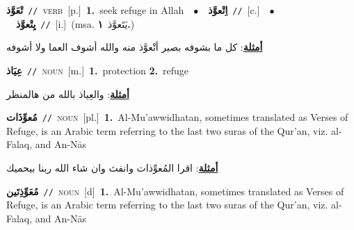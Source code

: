 \documentclass[10pt,a4paper,twoside]{article} %
\begin{document}
\begin{multicols}{2}
{\setlength\topsep{0pt}\textbf{\foreignlanguage{arabic}{تْعَوَّذ}}\ {\color{gray}\texttt{//}\color{black}}\ \textsc{verb}\ [p.]\ \textbf{1.}~seek refuge in Allah\ \ $\bullet$\ \ \setlength\topsep{0pt}\textbf{\foreignlanguage{arabic}{اِتْعوَّذ}}\ {\color{gray}\texttt{//}\color{black}}\ [c.]\ \ $\bullet$\ \ \setlength\topsep{0pt}\textbf{\foreignlanguage{arabic}{يِتْعوَّذ}}\ {\color{gray}\texttt{//}\color{black}}\ [i.]\ \color{gray}(msa. \foreignlanguage{arabic}{يَتَعوَّذ}~\foreignlanguage{arabic}{\textbf{١.}})\color{black}\  \begin{flushright}\color{gray}\foreignlanguage{arabic}{\textbf{\underline{\foreignlanguage{arabic}{أمثلة}}}: كل ما بشوفه بصير أتْعوَّذ منه والله أشوف العما ولا أشوفه}\end{flushright}\color{black}} \vspace{2mm}

{\setlength\topsep{0pt}\textbf{\foreignlanguage{arabic}{عِيَاذ}}\ {\color{gray}\texttt{//}\color{black}}\ \textsc{noun}\ [m.]\ \textbf{1.}~protection  \textbf{2.}~refuge\  \begin{flushright}\color{gray}\foreignlanguage{arabic}{\textbf{\underline{\foreignlanguage{arabic}{أمثلة}}}: والعِياذ بالله من هالمنظر}\end{flushright}\color{black}} \vspace{2mm}

{\setlength\topsep{0pt}\textbf{\foreignlanguage{arabic}{مُعوِّذَات}}\ {\color{gray}\texttt{//}\color{black}}\ \textsc{noun}\ [pl.]\ \textbf{1.}~Al-Mu'awwidhatan, sometimes translated as Verses of Refuge, is an Arabic term referring to the last two suras of the Qur'an, viz. al-Falaq, and An-Nās\  \begin{flushright}\color{gray}\foreignlanguage{arabic}{\textbf{\underline{\foreignlanguage{arabic}{أمثلة}}}: اقرا المُعوِّذات وانفث وان شاء الله ربنا بيحميك}\end{flushright}\color{black}} \vspace{2mm}

{\setlength\topsep{0pt}\textbf{\foreignlanguage{arabic}{مُعَوِّذِتَين}}\ {\color{gray}\texttt{//}\color{black}}\ \textsc{noun}\ [d]\ \textbf{1.}~Al-Mu'awwidhatan, sometimes translated as Verses of Refuge, is an Arabic term referring to the last two suras of the Qur'an, viz. al-Falaq, and An-Nās\ } \vspace{2mm}


\end{multicols}
\end{document}
